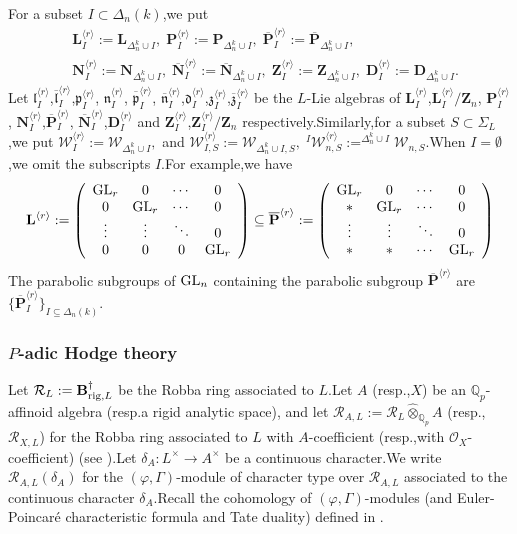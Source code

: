 \documentclass[SecEq,CM,GP]{degruyter-crelle} %
\theoremstyle{plain}
\newcommand{\GLN}{{\rm GL}}
\newcommand{\lrr}{{\langle r\rangle}}
\newcommand{\op}{{\overline{{\mathbf{P}}}}}
\newcommand{\onn}{{\overline{{\mathbf{N}}}}}
\newcommand{\rig}{{\rm rig}}
\newcommand{\BQ}{{\mathbb{Q}}}
\newcommand{\bB}{{\mathbf{B}}}
\newcommand{\bD}{{\mathbf{D}}}
\newcommand{\bL}{{\mathbf{L}}}
\newcommand{\bN}{{\mathbf{N}}}
\newcommand{\bP}{{\mathbf{P}}}
\newcommand{\bZ}{{\mathbf{Z}}}
\newcommand{\cR}{\mathcal R}
\newcommand{\cO}{\mathcal O}
\newcommand{\fd}{{\mathfrak{d}}}
\newcommand{\fl}{{\mathfrak{l}}}
\newcommand{\fn}{{\mathfrak{n}}}
\newcommand{\fp}{{\mathfrak{p}}}
\newcommand{\fz}{{\mathfrak{z}}}
\newcommand{\sW}{\mathscr W}
\begin{document}
For a subset $I\subset {\Delta_n(k)}$,\;we put
\begin{equation}
	\begin{aligned}
		&\bL^{\lrr}_I:=\bL_{\Delta_n^k\cup I},\;\bP^{\lrr}_I:=\bP_{\Delta_n^k\cup I},\;\op^{\lrr}_I:=\op_{\Delta_n^k\cup I},\\
		&\bN^{\lrr}_I:=\bN_{\Delta_n^k\cup I},\;\onn^{\lrr}_I:=\onn_{\Delta_n^k\cup I},\;\bZ^{\lrr}_I:=\bZ_{\Delta_n^k\cup I},\;\bD^{\lrr}_I:=\bD_{\Delta_n^k\cup I}.
	\end{aligned}
\end{equation}
Let $\fl^{\lrr}_I$,\;$\overline{\fl}^{\lrr}_I$,\;$\fp^{\lrr}_I$, $\fn^{\lrr}_I$, $\overline{\fp}^{\lrr}_I$, $\overline{\fn}^{\lrr}_I$,\;$\fd^{\lrr}_I$,\;$\fz^{\lrr}_I$,\;$\overline{\fz}^{\lrr}_I$ be the $L$-Lie algebras of $\bL^{\lrr}_I$,\;$\bL^{\lrr}_I/\bZ_n$, $\bP^{\lrr}_I$, $\bN^{\lrr}_I$,$\op^{\lrr}_I$, $\onn^{\lrr}_I$,\;$\bD^{\lrr}_I$ and $\bZ^{\lrr}_I$,\;$\bZ^{\lrr}_I/\bZ_n$ respectively.\;Similarly,\;for a subset $S\subset \Sigma_L$,\;we put $\sW^{\lrr}_{I}:=\sW_{\Delta_n^k\cup I},$ and $\sW^{\lrr}_{I,S}:=\sW_{\Delta_n^k\cup I,S},\;^{I}\sW_{n,S}^{\lrr}:=^{\Delta_n^k\cup I}\sW_{n,S}$.\;When $I=\emptyset$,\;we omit the subscripts $I$.\;For example,\;we have
\[\bL^{\lrr}:=\left(\begin{array}{cccc}
\GLN_r & 0 & \cdots & 0 \\
0 & \GLN_r & \cdots & 0 \\
\vdots & \vdots & \ddots & 0 \\
0 & 0 & 0 & \GLN_r \\
\end{array}\right)\subseteq \op^{\lrr}:=\left(\begin{array}{cccc}
\GLN_r & 0 & \cdots & 0 \\
\ast & \GLN_r & \cdots & 0 \\
\vdots & \vdots & \ddots & 0 \\
\ast & \ast & \cdots & \GLN_r \\
\end{array}\right)\]
The parabolic subgroups of $\GLN_n$ containing the parabolic subgroup $\op^{\lrr}$ are  $\{\op^{\lrr}_I\}_{I\subseteq \Delta_n(k)}$.\;




\subsubsection*{$P$-adic Hodge theory}

Let $\cR_{L}:=\bB_{\rig,L}^{\dagger}$ be the Robba ring associated to $L$.\;Let $A$ (resp.,\;$X$) be an $\BQ_p$-affinoid algebra (resp.\;a rigid analytic space), and let $\cR_{A,L}:=\cR_{L}\widehat{\otimes}_{\BQ_p} A$ (resp.,\;$\cR_{X,L}$) for the Robba ring associated to $L$ with $A$-coefficient (resp.,\;with $\cO_X$-coefficient) (see \cite[Definition 6.2.1]{XLROBBA}).\;Let $\delta_A:L^\times\rightarrow A^\times$ be a continuous character.\;We write  $\cR_{A,L}(\delta_A)$ for the $(\varphi,\Gamma)$-module of character type  over $\cR_{A,L}$ associated to the continuous character $\delta_A$.\;Recall the cohomology of $(\varphi,\Gamma)$-modules (and Euler-Poincar\'{e} characteristic formula and Tate duality) defined in \cite{liu2007cohomology}.\;
\end{document}
